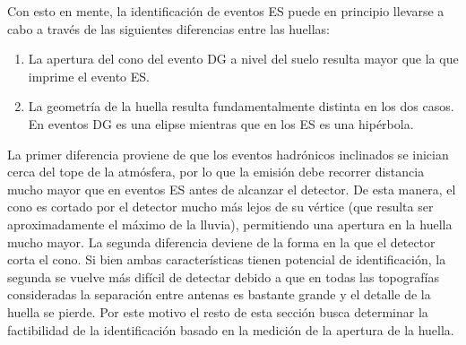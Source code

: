 	Con esto en mente, la identificaci\'on de eventos ES puede en principio llevarse a cabo a trav\'es de las siguientes diferencias entre las huellas:
	\begin{enumerate}
	 \item La apertura del cono del evento DG a nivel del suelo resulta mayor que la que imprime el evento ES.
	 \item La geometr\'ia de la huella resulta fundamentalmente distinta en los dos casos. En eventos DG es una elipse mientras que en los ES es una hip\'erbola.
	\end{enumerate}

	La primer diferencia proviene de que los eventos hadr\'onicos inclinados se inician cerca del tope de la atm\'osfera, por lo que la emisi\'on debe recorrer distancia mucho mayor que en eventos ES antes de alcanzar el detector.
	De esta manera, el cono \cher{} es cortado por el detector mucho m\'as lejos de su v\'ertice (que resulta ser aproximadamente el m\'aximo de la lluvia), permitiendo una apertura en la huella mucho mayor.
	La segunda diferencia deviene de la forma en la que el detector corta el cono.
	Si bien ambas caracter\'isticas tienen potencial de identificaci\'on, la segunda se vuelve m\'as dif\'icil de detectar debido a que en todas las topograf\'ias consideradas la separaci\'on entre antenas es bastante grande y el detalle de la huella se pierde.
	Por este motivo el resto de esta secci\'on busca determinar la factibilidad de la identificaci\'on basado en la medici\'on de la apertura de la huella.
	
